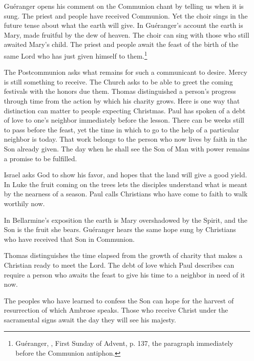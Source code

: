 Guéranger opens his comment on the Communion chant by telling us when it is sung. The priest and people have received Communion. Yet the choir sings in the future tense about what the earth will give. In Guéranger's account the earth is Mary, made fruitful by the dew of heaven. The choir can sing with those who still awaited Mary's child. The priest and people await the feast of the birth of the same Lord who has just given himself to them.\footnote{Guéranger, , First Sunday of Advent, p. 137, the paragraph immediately before the Communion antiphon.}

The Postcommunion asks what remains for such a communicant to desire. Mercy is still something to receive. The Church asks to be able to greet the coming festivals with the honors due them. Thomas distinguished a person's progress through time from the action by which his charity grows. Here is one way that distinction can matter to people expecting Christmas. Paul has spoken of a debt of love to one's neighbor immediately before the lesson. There can be weeks still to pass before the feast, yet the time in which to go to the help of a particular neighbor is today. That work belongs to the person who now lives by faith in the Son already given. The day when he shall see the Son of Man with power remains a promise to be fulfilled.

\begin{fourSenses}
\item[Literal.] Israel asks God to show his favor, and hopes that the land will give a good yield. In Luke the fruit coming on the trees lets the disciples understand what is meant by the nearness of a season. Paul calls Christians who have come to faith to walk worthily now.
\item[Allegorical.] In Bellarmine's exposition the earth is Mary overshadowed by the Spirit, and the Son is the fruit she bears. Guéranger hears the same hope sung by Christians who have received that Son in Communion.
\item[Moral.] Thomas distinguishes the time elapsed from the growth of charity that makes a Christian ready to meet the Lord. The debt of love which Paul describes can require a person who awaits the feast to give his time to a neighbor in need of it now.
\item[Anagogical.] The peoples who have learned to confess the Son can hope for the harvest of resurrection of which Ambrose speaks. Those who receive Christ under the sacramental signs await the day they will see his majesty.
\end{fourSenses}
